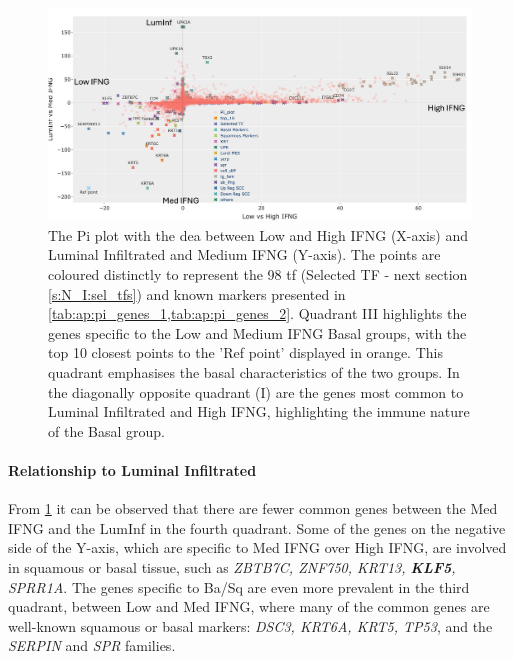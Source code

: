 \begin{figure}[!htb]    
    \centering
    \includegraphics[width=1.0\textwidth,keepaspectratio]{Sections/ClusteringAnalysis/Resources/discussion/basal_inf_pi.png}
    \caption[Pi plot - for the DEA between the basal groups and immune infiltration]{The Pi plot with the \acrshort{dea} between Low and High IFNG (X-axis) and Luminal Infiltrated and Medium IFNG (Y-axis). The points are coloured distinctly to represent the 98 \acrlong{tf} (Selected TF - next section \cref{s:N_I:sel_tfs}) and known markers presented in \cref{tab:ap:pi_genes_1,tab:ap:pi_genes_2}. Quadrant III highlights the genes specific to the Low and Medium IFNG Basal groups, with the top 10 closest points to the 'Ref point' displayed in orange. This quadrant emphasises the basal characteristics of the two groups. In the diagonally opposite quadrant (I) are the genes most common to Luminal Infiltrated and High IFNG, highlighting the immune nature of the Basal group.}
    \label{fig:cs:pi_basal_inf}
\end{figure}


\paragraph*{Relationship to Luminal Infiltrated}

From \cref{fig:cs:pi_basal_inf} it can be observed that there are fewer common genes between the Med IFNG and the LumInf in the fourth quadrant. Some of the genes on the negative side of the Y-axis, which are specific to Med IFNG over High IFNG, are involved in squamous or basal tissue, such as \textit{ZBTB7C, ZNF750, KRT13, \textbf{KLF5}, SPRR1A}. The genes specific to Ba/Sq are even more prevalent in the third quadrant, between Low and Med IFNG, where many of the common genes are well-known squamous or basal markers: \textit{DSC3, KRT6A, KRT5, TP53}, and the \textit{SERPIN} and \textit{SPR} families.

